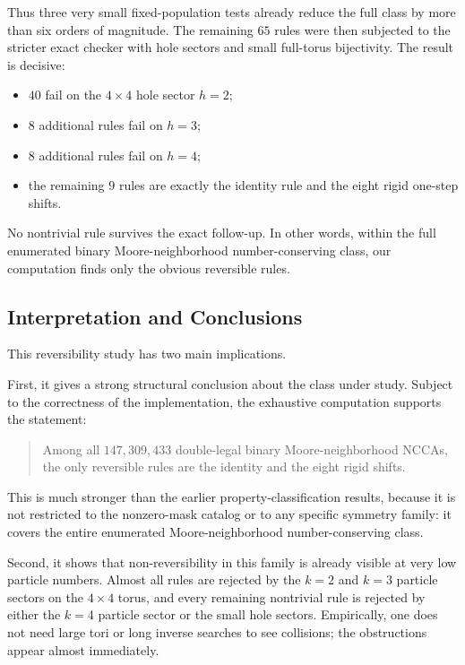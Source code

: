 \documentclass[11pt,a4paper]{article}
\begin{document}
Thus three very small fixed-population tests already reduce the full class by more than six
orders of magnitude.  The remaining \(65\) rules were then subjected to the stricter exact
checker with hole sectors and small full-torus bijectivity.  The result is decisive:
\begin{itemize}
\item \(40\) fail on the \(4\times4\) hole sector \(h=2\);
\item \(8\) additional rules fail on \(h=3\);
\item \(8\) additional rules fail on \(h=4\);
\item the remaining \(9\) rules are exactly the identity rule and the eight rigid one-step shifts.
\end{itemize}

No nontrivial rule survives the exact follow-up.  In other words, within the full enumerated
binary Moore-neighborhood number-conserving class, our computation finds only the obvious
reversible rules.

\subsection{Interpretation and Conclusions}

This reversibility study has two main implications.

First, it gives a strong structural conclusion about the class under study.  Subject to the
correctness of the implementation, the exhaustive computation supports the statement:
\begin{quote}
Among all \(147{,}309{,}433\) double-legal binary Moore-neighborhood NCCAs, the only reversible
rules are the identity and the eight rigid shifts.
\end{quote}
This is much stronger than the earlier property-classification results, because it is not
restricted to the nonzero-mask catalog or to any specific symmetry family: it covers the entire
enumerated Moore-neighborhood number-conserving class.

Second, it shows that non-reversibility in this family is already visible at very low particle
numbers.  Almost all rules are rejected by the \(k=2\) and \(k=3\) particle sectors on the
\(4\times4\) torus, and every remaining nontrivial rule is rejected by either the \(k=4\)
particle sector or the small hole sectors.  Empirically, one does not need large tori or long
inverse searches to see collisions; the obstructions appear almost immediately.
\end{document}
